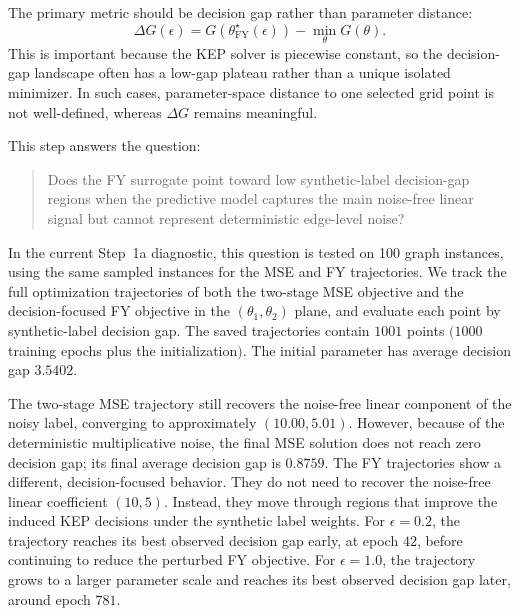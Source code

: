\documentclass{article}
\begin{document}
The primary metric should be decision gap rather than parameter distance:
\[
    \Delta G(\epsilon)
    =
    G(\theta^\star_{\mathrm{FY}}(\epsilon))
    -
    \min_{\theta} G(\theta).
\]
This is important because the KEP solver is piecewise constant, so the
decision-gap landscape often has a low-gap plateau rather than a unique isolated
minimizer. In such cases, parameter-space distance to one selected grid point is
not well-defined, whereas \(\Delta G\) remains meaningful.

This step answers the question:

\begin{quote}
Does the FY surrogate point toward low synthetic-label decision-gap regions when
the predictive model captures the main noise-free linear signal but cannot represent
deterministic edge-level noise?
\end{quote}

In the current Step~1a diagnostic, this question is tested on 100 graph
instances, using the same sampled instances for the MSE and FY trajectories. We
track the full optimization trajectories of both the two-stage MSE objective and
the decision-focused FY objective in the \((\theta_1,\theta_2)\) plane, and
evaluate each point by synthetic-label decision gap. The saved trajectories
contain \(1001\) points
\((1000\) training epochs plus the initialization\()\). The initial parameter
has average decision gap \(3.5402\).

The two-stage MSE trajectory still recovers the noise-free linear component of the noisy
label, converging to approximately \((10.00,5.01)\). However, because of the
deterministic multiplicative noise, the final MSE solution does not reach zero
decision gap; its final average decision gap is \(0.8759\). The FY trajectories
show a different, decision-focused behavior. They do not need to recover the
noise-free linear coefficient \((10,5)\). Instead, they move through regions
that improve the induced KEP decisions under the synthetic label weights. For
\(\epsilon=0.2\), the trajectory reaches its best observed decision gap early,
at epoch \(42\), before continuing to reduce the perturbed FY objective. For
\(\epsilon=1.0\), the trajectory grows to a larger parameter scale and reaches
its best observed decision gap later, around epoch \(781\).

\begin{center}
\small
{}
\end{center}
\end{document}
